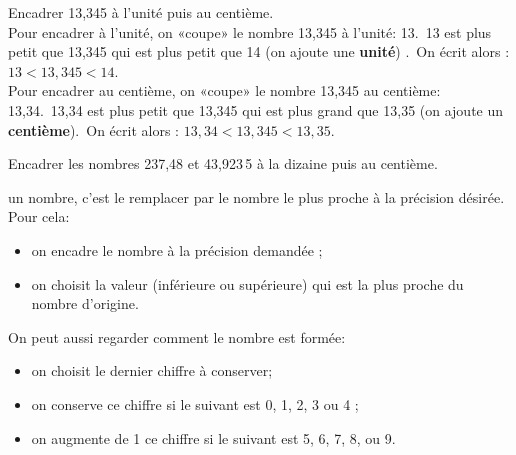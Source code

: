 \begin{methode*1}[Encadrer]

\begin{exemple*1}
Encadrer 13,345 à l'unité puis au centième.\\[0.5em]
Pour encadrer à l'unité, on «coupe» le nombre 13,345 à l'unité: 13.\
13 est plus petit  que 13,345 qui est plus petit que 14 (on ajoute une \textbf{unité}) .\
On écrit alors : $13 < 13,345 < 14$. \\[1em]
Pour encadrer au centième, on «coupe» le nombre 13,345 au centième: 13,34.\
13,34 est plus petit que 13,345 qui est plus grand que 13,35 (on ajoute un \textbf{centième}).\
On écrit alors : $13,34 < 13,345 < 13,35$.
\end{exemple*1}

\exercice

Encadrer les nombres 237,48 et 43,923\,5 à la dizaine puis au centième.

\end{methode*1}



\begin{aconnaitre}
\textbf{\MotDefinition{Arrondir}{}} un nombre, c’est le remplacer par le nombre le plus proche à la précision désirée. Pour cela:
\begin{itemize}
 \item on encadre le nombre à la précision demandée ;
 \item on choisit la valeur (inférieure ou supérieure) qui est la plus proche du nombre d'origine.
 \end{itemize}


On peut aussi regarder comment le nombre est formée:
\begin{itemize}
\item on choisit le dernier chiffre à conserver;
 \item on conserve ce chiffre si le suivant est 0, 1, 2, 3 ou 4 ;
 \item on augmente de 1 ce chiffre si le suivant est 5, 6, 7, 8, ou 9.
 \end{itemize}
\end{aconnaitre}


